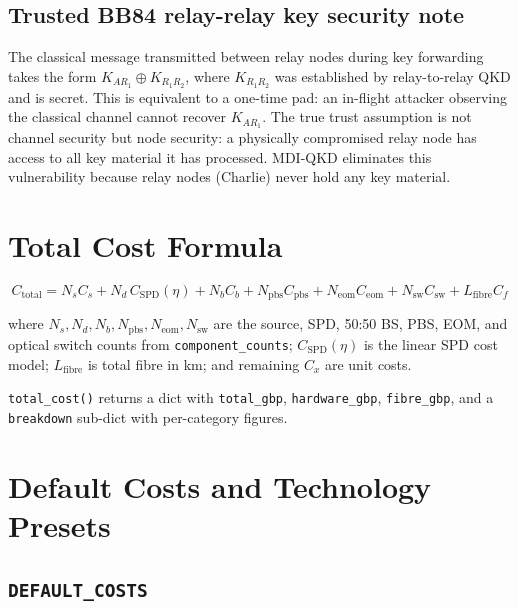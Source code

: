 \documentclass[12pt,a4paper]{article}
\begin{document}
\subsection{Trusted BB84 relay-relay key security note}

The classical message transmitted between relay nodes during key forwarding
takes the form $K_{AR_1} \oplus K_{R_1 R_2}$, where $K_{R_1 R_2}$ was
established by relay-to-relay QKD and is secret. This is equivalent to a
one-time pad: an in-flight attacker observing the classical channel cannot
recover $K_{AR_1}$. The true trust assumption is not channel security
but node security: a physically compromised relay node has access to all
key material it has processed. MDI-QKD eliminates this vulnerability because
relay nodes (Charlie) never hold any key material.

\section{Total Cost Formula}

\[
C_{\mathrm{total}} = N_s C_s
                   + N_d\,C_{\mathrm{SPD}}(\eta)
                   + N_b C_b
                   + N_{\mathrm{pbs}} C_{\mathrm{pbs}}
                   + N_{\mathrm{eom}} C_{\mathrm{eom}}
                   + N_{\mathrm{sw}} C_{\mathrm{sw}}
                   + L_{\mathrm{fibre}} C_f
\]

where $N_s, N_d, N_b, N_{\mathrm{pbs}}, N_{\mathrm{eom}}, N_{\mathrm{sw}}$
are the source, SPD, 50:50 BS, PBS, EOM, and optical switch counts from
\texttt{component\_counts}; $C_{\mathrm{SPD}}(\eta)$ is the linear SPD cost
model; $L_{\mathrm{fibre}}$ is total fibre in km; and remaining $C_x$ are
unit costs.

\texttt{total\_cost()} returns a dict with \texttt{total\_gbp},
\texttt{hardware\_gbp}, \texttt{fibre\_gbp}, and a \texttt{breakdown} sub-dict
with per-category figures.

\section{Default Costs and Technology Presets}

\subsection{\texttt{DEFAULT\_COSTS}}
\end{document}
